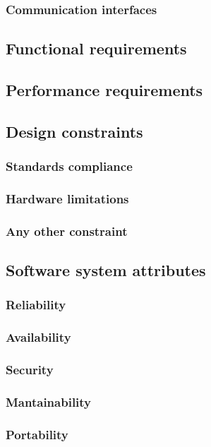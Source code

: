 \documentclass[12pt]{article}
\begin{document}
    \subsubsection{Communication interfaces}
  \subsection{Functional requirements}
  \subsection{Performance requirements}
  \subsection{Design constraints}
    \subsubsection{Standards compliance}
    \subsubsection{Hardware limitations}
    \subsubsection{Any other constraint}
  \subsection{Software system attributes}
    \subsubsection{Reliability}
    \subsubsection{Availability}
    \subsubsection{Security}
    \subsubsection{Mantainability}
    \subsubsection{Portability}
\end{document}
